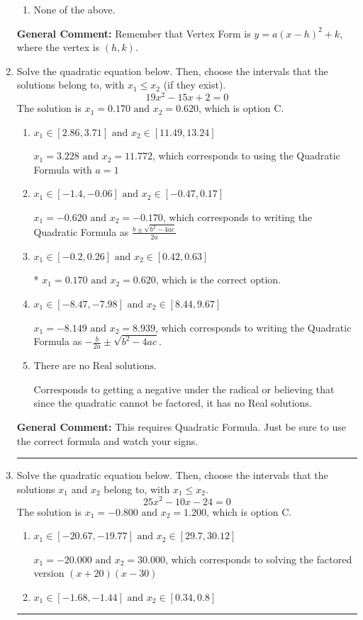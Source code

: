 \documentclass{extbook}[14pt]
\newcommand{\litem}[1]{\item #1

\rule{\textwidth}{0.4pt}}
\begin{document}
\begin{enumerate}
{\begin{enumerate}[label=\Alph*.]
\begin{multicols}{2}
\end{multicols}\item None of the above.\end{enumerate}
\textbf{General Comment:} Remember that Vertex Form is $y = a(x-h)^2+k$, where the vertex is $(h, k)$.
}
\litem{
Solve the quadratic equation below. Then, choose the intervals that the solutions belong to, with $x_1 \leq x_2$ (if they exist).
\[ 19x^{2} -15 x + 2 = 0 \]The solution is \( x_1 = 0.170 \text{ and } x_2 = 0.620 \), which is option C.\begin{enumerate}[label=\Alph*.]
\item \( x_1 \in [2.86, 3.71] \text{ and } x_2 \in [11.49, 13.24] \)

 $x_1 = 3.228 \text{ and } x_2 = 11.772$, which corresponds to using the Quadratic Formula with $a=1$
\item \( x_1 \in [-1.4, -0.06] \text{ and } x_2 \in [-0.47, 0.17] \)

 $x_1 = -0.620 \text{ and } x_2 = -0.170$, which corresponds to writing the Quadratic Formula as $\frac{b \pm \sqrt{b^2 - 4ac}}{2a}$
\item \( x_1 \in [-0.2, 0.26] \text{ and } x_2 \in [0.42, 0.63] \)

* $x_1 = 0.170 \text{ and } x_2 = 0.620$, which is the correct option.
\item \( x_1 \in [-8.47, -7.98] \text{ and } x_2 \in [8.44, 9.67] \)

 $x_1 = -8.149 \text{ and } x_2 = 8.939$, which corresponds to writing the Quadratic Formula as $-\frac{b}{2a} \pm \sqrt{b^2 - 4ac}$.
\item \( \text{There are no Real solutions.} \)

Corresponds to getting a negative under the radical or believing that since the quadratic cannot be factored, it has no Real solutions.
\end{enumerate}

\textbf{General Comment:} This requires Quadratic Formula. Just be sure to use the correct formula and watch your signs.
}
\litem{
Solve the quadratic equation below. Then, choose the intervals that the solutions $x_1$ and $x_2$ belong to, with $x_1 \leq x_2$.
\[ 25x^{2} -10 x -24 = 0 \]The solution is \( x_1 = -0.800 \text{ and } x_2 = 1.200 \), which is option C.\begin{enumerate}[label=\Alph*.]
\item \( x_1 \in [-20.67, -19.77] \text{ and } x_2 \in [29.7, 30.12] \)

$x_1 = -20.000 \text{ and } x_2 = 30.000$, which corresponds to solving the factored version $(x + 20)(x -30)$
\item \( x_1 \in [-1.68, -1.44] \text{ and } x_2 \in [0.34, 0.8] \)


\end{enumerate}}
\end{enumerate}
\end{document}
